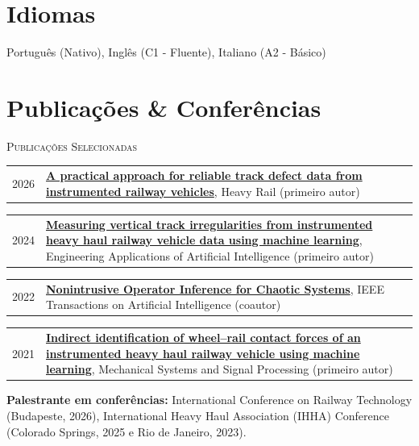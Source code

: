 \documentclass[a4paper,20pt]{article}
\makeatletter
\newcommand{\resumePub}[3]{%
  \noindent\begin{tabularx}{\textwidth}{@{}p{2.4em}@{\hspace{0.4em}}X@{}}
    {\small\textcolor[gray]{0.4}{#1}} & {\small\textbf{#2}, #3}
  \end{tabularx}\vspace{1pt}
}
\makeatother
\begin{document}
\vspace{-2pt}

\section{Idiomas}
\vspace{1pt}
{\small Português (Nativo), Inglês (C1 - Fluente), Italiano (A2 - Básico)}

\vspace{-3pt}

\section{Publicações \& Conferências}
\vspace{1pt}

{\scshape Publicações Selecionadas}
\vspace{2pt}

\resumePub{2026}{\href{https://doi.org/10.1016/j.hrail.2026.100007}{A practical approach for reliable track defect data from instrumented railway vehicles}}{Heavy Rail (primeiro autor)}
\resumePub{2024}{\href{https://doi.org/10.1016/j.engappai.2023.107191}{Measuring vertical track irregularities from instrumented heavy haul railway vehicle data using machine learning}}{Engineering Applications of Artificial Intelligence (primeiro autor)}
\resumePub{2022}{\href{https://doi.org/10.1109/TAI.2022.3207449}{Nonintrusive Operator Inference for Chaotic Systems}}{IEEE Transactions on Artificial Intelligence (coautor)}
\resumePub{2021}{\href{https://doi.org/10.1016/j.ymssp.2021.107806}{Indirect identification of wheel--rail contact forces of an instrumented heavy haul railway vehicle using machine learning}}{Mechanical Systems and Signal Processing (primeiro autor)}

\vspace{2pt}
{\small \textbf{Palestrante em conferências:} International Conference on Railway Technology (Budapeste, 2026), International Heavy Haul Association (IHHA) Conference (Colorado Springs, 2025 e Rio de Janeiro, 2023).\par}

\vspace{-3pt}
\end{document}
